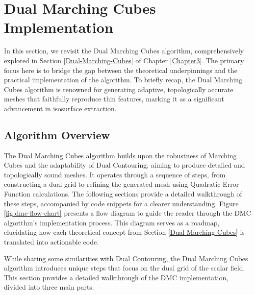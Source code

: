 \section{Dual Marching Cubes Implementation} \label{sec:dmc-implementation}

In this section, we revisit the Dual Marching Cubes algorithm, comprehensively explored in Section \ref{Dual-Marching-Cubes} of Chapter \ref{Chapter3}. The primary focus here is to bridge the gap between the theoretical underpinnings and the practical implementation of the algorithm. To briefly recap, the Dual Marching Cubes algorithm is renowned for generating adaptive, topologically accurate meshes that faithfully reproduce thin features, marking it as a significant advancement in isosurface extraction.

\subsection{Algorithm Overview}

The Dual Marching Cubes algorithm builds upon the robustness of Marching Cubes and the adaptability of Dual Contouring, aiming to produce detailed and topologically sound meshes. It operates through a sequence of steps, from constructing a dual grid to refining the generated mesh using Quadratic Error Function calculations. The following sections provide a detailed walkthrough of these steps, accompanied by code snippets for a clearer understanding. Figure \ref{fig:dmc-flow-chart} presents a flow diagram to guide the reader through the DMC algorithm's implementation process. This diagram serves as a roadmap, elucidating how each theoretical concept from Section \ref{Dual-Marching-Cubes} is translated into actionable code.

While sharing some similarities with Dual Contouring, the Dual Marching Cubes algorithm introduces unique steps that focus on the dual grid of the scalar field. This section provides a detailed walkthrough of the DMC implementation, divided into three main parts.

